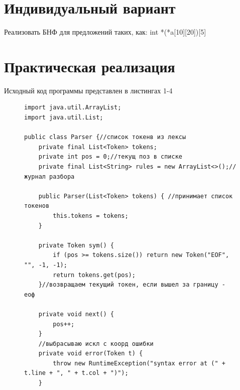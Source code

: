 \documentclass[a4paper, 14pt]{extarticle}
\begin{document}
\section{Индивидуальный вариант}\label{Sect::task}
\par
Реализовать БНФ для предложений таких, как: int *(*a[10][20])[5]
\section {Практическая реализация}
Исходный код программы представлен в листингах 1-4
\begin{figure}[!htb]
\begin{lstlisting}[language={},caption={класс},label={lst:code1}]
import java.util.ArrayList;
import java.util.List;

public class Parser {//список токенв из лексы
    private final List<Token> tokens;
    private int pos = 0;//текущ поз в списке
    private final List<String> rules = new ArrayList<>();//журнал разбора

    public Parser(List<Token> tokens) { //принимает список токенов
        this.tokens = tokens;
    }

    private Token sym() {
        if (pos >= tokens.size()) return new Token("EOF", "", -1, -1);
        return tokens.get(pos);
    }//возвращаем текущий токен, если вышел за границу - еоф

    private void next() {
        pos++;
    }
    //выбрасываю искл с коорд ошибки
    private void error(Token t) {
        throw new RuntimeException("syntax error at (" + t.line + ", " + t.col + ")");
    }


\end{lstlisting}
\end{figure}
\end{document}
